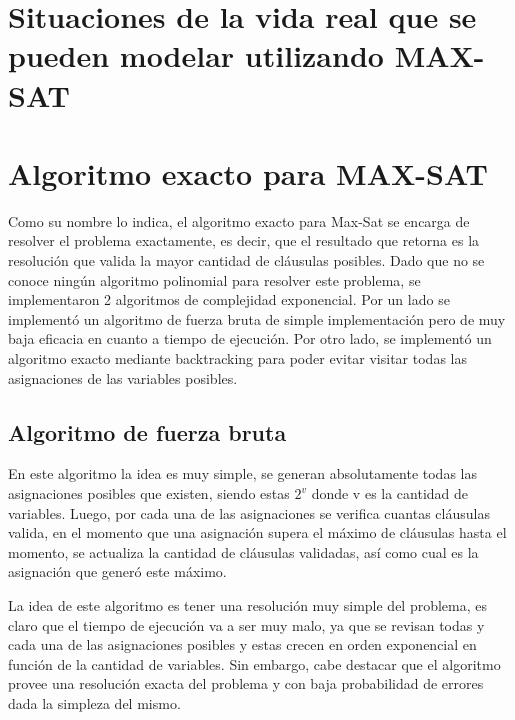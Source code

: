 \documentclass[a4paper,10pt]{article}
\begin{document}
\section*{Situaciones de la vida real que se pueden modelar utilizando MAX-SAT}




\section*{Algoritmo exacto para MAX-SAT}
Como su nombre lo indica, el algoritmo exacto para Max-Sat se encarga de resolver el problema exactamente, es decir, que el resultado que retorna es la resoluci\'on que valida la mayor cantidad de cl\'ausulas posibles. Dado que no se conoce ning\'un algoritmo polinomial para resolver este problema, se implementaron 2 algoritmos de complejidad exponencial. Por un lado se implement\'o un algoritmo de fuerza bruta de simple implementaci\'on pero de muy baja eficacia en cuanto a tiempo de ejecuci\'on. Por otro lado, se implement\'o un algoritmo exacto mediante backtracking para poder evitar visitar todas las asignaciones de las variables posibles.

\subsection*{Algoritmo de fuerza bruta}
En este algoritmo la idea es muy simple, se generan absolutamente todas las asignaciones posibles que existen, siendo estas $2^{v}$ donde v es la cantidad de variables. Luego, por cada una de las asignaciones se verifica cuantas cl\'ausulas valida, en el momento que una asignaci\'on supera el m\'aximo de cl\'ausulas hasta el momento, se actualiza la cantidad de cl\'ausulas validadas, as\'i como cual es la asignaci\'on que gener\'o este m\'aximo.

La idea de este algoritmo es tener una resoluci\'on muy simple del problema, es claro que el tiempo de ejecuci\'on va a ser muy malo, ya que se revisan todas y cada una de las asignaciones posibles y estas crecen en orden exponencial en funci\'on de la cantidad de variables. Sin embargo, cabe destacar que el algoritmo provee una resoluci\'on exacta del problema y con baja probabilidad de errores dada la simpleza del mismo.
\end{document}
